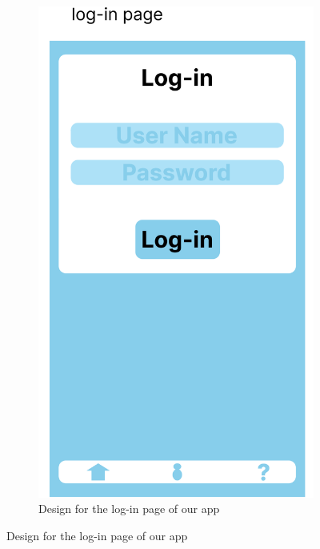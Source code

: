 \begin{figure}
\begin{subfigure}[T]{0.4\linewidth}
		\includegraphics[width=\linewidth]{figures/log_in.png}
		\caption{Design for the log-in page of our app}
		\label{fig:log_in}
	\end{subfigure}
\end{figure}

